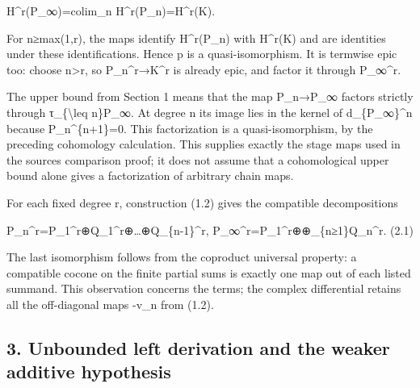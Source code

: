 \documentclass[11pt]{article}
\begin{document}
H\textasciicircum{}r(P\_\allowbreak{}∞)\allowbreak{}\allowbreak{}=colim\_\allowbreak{}n H\textasciicircum{}r(P\_\allowbreak{}n)\allowbreak{}\allowbreak{}=H\textasciicircum{}r(K)\allowbreak{}.

For n≥max(1,\allowbreak{}r)\allowbreak{},\allowbreak{} the maps identify H\textasciicircum{}r(P\_\allowbreak{}n)\allowbreak{} with H\textasciicircum{}r(K)\allowbreak{} and are identities under these identifications. Hence p is a quasi-isomorphism. It is termwise epic too:\allowbreak{} choose n>r,\allowbreak{} so P\_\allowbreak{}n\textasciicircum{}r\allowbreak{}→K\textasciicircum{}r is already epic,\allowbreak{} and factor it through P\_\allowbreak{}∞\textasciicircum{}r.

The upper bound from Section 1 means that the map P\_\allowbreak{}n\allowbreak{}→P\_\allowbreak{}∞ factors strictly through τ\_\allowbreak{}\{\textbackslash{}leq n\}P\_\allowbreak{}∞. At degree n its image lies in the kernel of d\_\allowbreak{}\{P\_\allowbreak{}∞\}\textasciicircum{}n because P\_\allowbreak{}n\textasciicircum{}\{n\allowbreak{}+1\}\allowbreak{}=0. This factorization is a quasi-isomorphism,\allowbreak{} by the preceding cohomology calculation. This supplies exactly the stage maps used in the source\textquotesingle s comparison proof; it does not assume that a cohomological upper bound alone gives a factorization of arbitrary chain maps.

For each fixed degree r,\allowbreak{} construction (1.2)\allowbreak{} gives the compatible decompositions

P\_\allowbreak{}n\textasciicircum{}r\allowbreak{}=P\_\allowbreak{}1\textasciicircum{}r\allowbreak{}⊕Q\_\allowbreak{}1\textasciicircum{}r\allowbreak{}⊕…\allowbreak{}⊕Q\_\allowbreak{}\{n-1\}\textasciicircum{}r,\allowbreak{} P\_\allowbreak{}∞\textasciicircum{}r\allowbreak{}=P\_\allowbreak{}1\textasciicircum{}r\allowbreak{}⊕\allowbreak{}⊕\_\allowbreak{}\{n≥1\}Q\_\allowbreak{}n\textasciicircum{}r. (2.1)\allowbreak{}

The last isomorphism follows from the coproduct universal property:\allowbreak{} a compatible cocone on the finite partial sums is exactly one map out of each listed summand. This observation concerns the terms; the complex differential retains all the off-diagonal maps -v\_\allowbreak{}n from (1.2)\allowbreak{}.

\subsection{3. Unbounded left derivation and the weaker additive hypothesis}\label{proofs-9206-9744-unbounded-left-derivation-and-the-weaker-additive-hypothesis}
\end{document}
